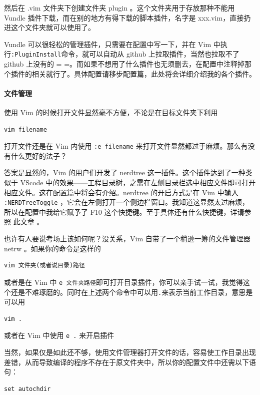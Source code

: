 然后在 .vim 文件夹下创建文件夹 plugin 。这个文件夹用于存放那种不能用 Vundle 插件下载，而在别的地方有得下载的脚本插件，名字是 xxx.vim，直接扔进这个文件夹就可以使用了。

Vundle 可以很轻松的管理插件，只需要在配置中写一下，并在 Vim 中执行\texttt{:PluginInstall}命令，就可以自动从 github 上拉取插件，当然也拉取不了 github 上没有的 = =。而如果不想用了什么插件也无须删去，在配置中注释掉那个插件的相关就行了。具体配置请移步配置篇，此处将会详细介绍我的各个插件。

\paragraph{文件管理}

使用 Vim 的时候打开文件显然毫不方便，不论是在目标文件夹下利用

\begin{verbatim}
vim filename
\end{verbatim}

打开文件还是在 Vim 内使用 \texttt{:e filename} 来打开文件显然都过于麻烦。那么有没有什么更好的法子？

答案是显然的，Vim 的用户们开发了 nerdtree 这一插件。这个插件达到了一种类似于 VScode 中的效果——工程目录树，之需在左侧目录栏选中相应文件即可打开相应文件。这在配置篇中将会有介绍。nerdtree 的开启方式是在 Vim 中输入 \texttt{:NERDTreeToggle} ，它会在左侧打开一个侧边栏窗口。我知道这显然太过麻烦，所以在配置中我给它赋予了 F10 这个快捷键。至于具体还有什么快捷键，详请参照  此文章 。

也许有人要说考场上该如何呢？没关系，Vim 自带了一个稍逊一筹的文件管理器 netrw 。如果你的命令是这样的

\begin{verbatim}
vim 文件夹(或者说目录)路径
\end{verbatim}

或者是在 Vim 中 \texttt{e 文件夹路径}即可打开目录插件，你可以亲手试一试，我觉得这个还是不难琢磨的。同时在上述两个命令中可以用\texttt{.}来表示当前工作目录，意思是可以用

\begin{verbatim}
vim .
\end{verbatim}

或者在 Vim 中使用 \texttt{e .} 来开启插件

当然，如果仅是如此还不够，使用文件管理器打开文件的话，容易使工作目录出现差错，从而导致编译的程序不存在于原文件夹中，所以你的配置文件中还需以下语句：

\begin{verbatim}
set autochdir
\end{verbatim}

